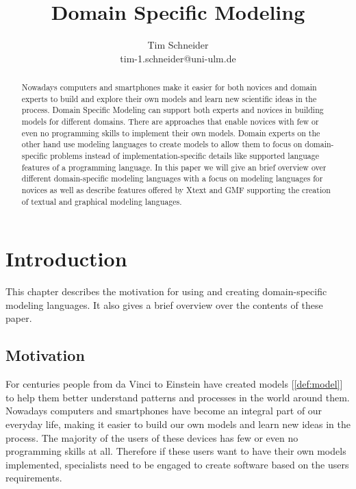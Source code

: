\documentclass[runningheads,a4paper]{llncs}
\begin{document}
\mainmatter  %

\title{Domain Specific Modeling}



\author{Tim Schneider\\ tim-1.schneider@uni-ulm.de}


\maketitle


\begin{abstract}
Nowadays computers and smartphones make it easier for both novices and domain experts to build 
and explore their own models and learn new scientific ideas in the process.
Domain Specific Modeling can support both experts and novices in building models for different domains.
There are approaches that enable novices with few or even no programming skills to implement their own models.
Domain experts on the other hand use modeling languages to create models to 
allow them to focus on domain-specific problems instead of implementation-specific details like supported 
language features of a programming language. 
In this paper we will give an brief overview over different domain-specific modeling languages with a focus on modeling languages for novices
as well as describe features offered by Xtext and GMF supporting the creation of textual and graphical modeling languages.
\end{abstract}

\section{Introduction}
\label{sec:introduction}
This chapter describes the motivation for using and creating domain-specific modeling languages. 
It also gives a brief overview over the contents of these paper.

\subsection{Motivation}
For centuries people from da Vinci to Einstein have created models [\ref{def:model}] to help them better 
understand patterns and processes in the world around them. Nowadays computers and smartphones have 
become an integral part of our everyday life, making it easier to build our own models and learn new ideas in the process.
The majority of the users of these devices has few or even no programming skills at all.
Therefore if these users want to have their own models implemented, specialists need to be engaged to create software based on the users requirements. 
\end{document}
